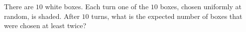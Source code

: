 There are $10$ white boxes. Each turn one of the $10$ boxes, chosen uniformly at random, is shaded. After $10$ turns, what is the expected number of boxes that were chosen at least twice?
